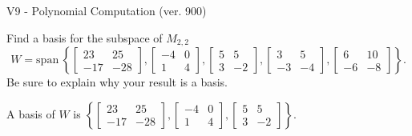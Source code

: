 \begin{exercise}
  \begin{exerciseTitle}V9 - Polynomial Computation (ver. 900)\end{exerciseTitle}
  \begin{exerciseStatement}
    Find a basis for the subspace of \(M_{2,2}\) 
\[W=\mathrm{span}\ \left\{\left[\begin{array}{cc}
23 & 25 \\
-17 & -28
\end{array}\right] , \left[\begin{array}{cc}
-4 & 0 \\
1 & 4
\end{array}\right] , \left[\begin{array}{cc}
5 & 5 \\
3 & -2
\end{array}\right] , \left[\begin{array}{cc}
3 & 5 \\
-3 & -4
\end{array}\right] , \left[\begin{array}{cc}
6 & 10 \\
-6 & -8
\end{array}\right]\right\}.\]
 Be sure to explain why your result is a basis.


  \end{exerciseStatement}
  \begin{exerciseAnswer}
   A basis of \(W\) is  \(\left\{\left[\begin{array}{cc}
23 & 25 \\
-17 & -28
\end{array}\right] , \left[\begin{array}{cc}
-4 & 0 \\
1 & 4
\end{array}\right] , \left[\begin{array}{cc}
5 & 5 \\
3 & -2
\end{array}\right]\right\}\).
  


  \end{exerciseAnswer}
\end{exercise}